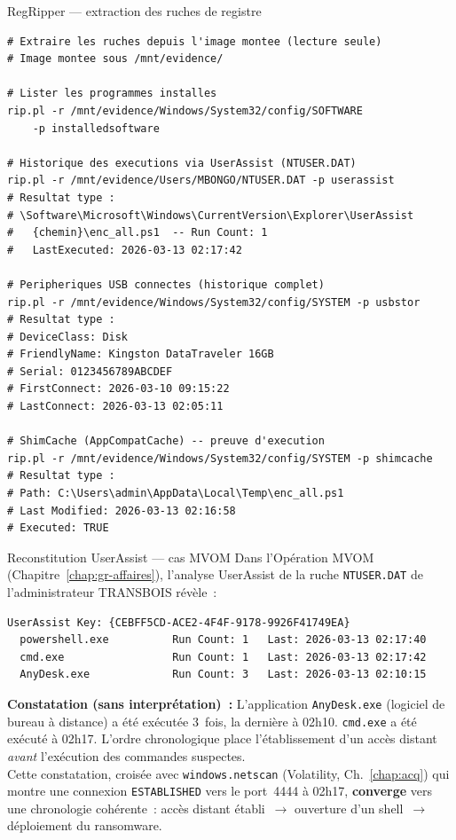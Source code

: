 \begin{boxoutils}{RegRipper --- extraction des ruches de registre}
\begin{lstlisting}[language=bash_forensique]
# Extraire les ruches depuis l'image montee (lecture seule)
# Image montee sous /mnt/evidence/

# Lister les programmes installes
rip.pl -r /mnt/evidence/Windows/System32/config/SOFTWARE
    -p installedsoftware

# Historique des executions via UserAssist (NTUSER.DAT)
rip.pl -r /mnt/evidence/Users/MBONGO/NTUSER.DAT -p userassist
# Resultat type :
# \Software\Microsoft\Windows\CurrentVersion\Explorer\UserAssist
#   {chemin}\enc_all.ps1  -- Run Count: 1
#   LastExecuted: 2026-03-13 02:17:42

# Peripheriques USB connectes (historique complet)
rip.pl -r /mnt/evidence/Windows/System32/config/SYSTEM -p usbstor
# Resultat type :
# DeviceClass: Disk
# FriendlyName: Kingston DataTraveler 16GB
# Serial: 0123456789ABCDEF
# FirstConnect: 2026-03-10 09:15:22
# LastConnect: 2026-03-13 02:05:11

# ShimCache (AppCompatCache) -- preuve d'execution
rip.pl -r /mnt/evidence/Windows/System32/config/SYSTEM -p shimcache
# Resultat type :
# Path: C:\Users\admin\AppData\Local\Temp\enc_all.ps1
# Last Modified: 2026-03-13 02:16:58
# Executed: TRUE
\end{lstlisting}
\end{boxoutils}

\begin{boxscenario}{Reconstitution UserAssist --- cas MVOM}
Dans l'Opération MVOM (Chapitre~\ref{chap:gr-affaires}), l'analyse
UserAssist de la ruche \texttt{NTUSER.DAT} de l'administrateur
TRANSBOIS révèle~:

\begin{lstlisting}[language=bash_forensique]
UserAssist Key: {CEBFF5CD-ACE2-4F4F-9178-9926F41749EA}
  powershell.exe          Run Count: 1   Last: 2026-03-13 02:17:40
  cmd.exe                 Run Count: 1   Last: 2026-03-13 02:17:42
  AnyDesk.exe             Run Count: 3   Last: 2026-03-13 02:10:15
\end{lstlisting}

\textbf{Constatation (sans interprétation)~:} L'application
\texttt{AnyDesk.exe} (logiciel de bureau à distance) a été exécutée
3~fois, la dernière à 02h10. \texttt{cmd.exe} a été exécuté à 02h17.
L'ordre chronologique place l'établissement d'un accès distant
\emph{avant} l'exécution des commandes suspectes.\\[0.3ex]
Cette constatation, croisée avec \texttt{windows.netscan} (Volatility,
Ch.~\ref{chap:acq}) qui montre une connexion \texttt{ESTABLISHED} vers
le port~4444 à 02h17, \textbf{converge} vers une chronologie cohérente~:
accès distant établi~$\to$ ouverture d'un shell~$\to$ déploiement
du ransomware.
\end{boxscenario}

